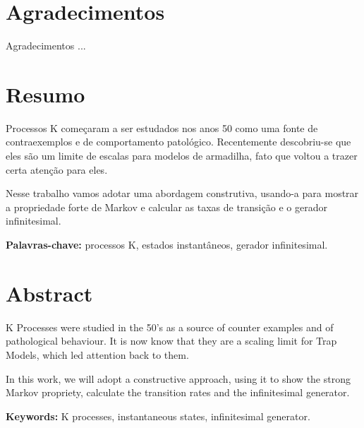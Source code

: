 \chapter*{Agradecimentos}
 Agradecimentos ...


\chapter*{Resumo}

Processos K começaram a ser estudados nos anos 50 como uma fonte de
contraexemplos e de comportamento patológico. Recentemente
descobriu-se que eles são um limite de escalas para modelos de
armadilha, fato que voltou a trazer certa atenção para eles.

Nesse trabalho vamos adotar uma abordagem construtiva, usando-a para
mostrar a propriedade forte de Markov e calcular as taxas de transição
e o gerador infinitesimal.

\noindent \textbf{Palavras-chave:} processos K, estados instantâneos,
gerador infinitesimal.

\chapter*{Abstract}

K Processes were studied in the 50's as a source of counter examples
and of pathological behaviour. It is now know that they are a scaling
limit for Trap Models, which led attention back to them.

In this work, we will adopt a constructive approach, using it to show
the strong Markov propriety, calculate the transition rates and
the infinitesimal generator.

\noindent \textbf{Keywords:} K processes, instantaneous states,
infinitesimal generator.


